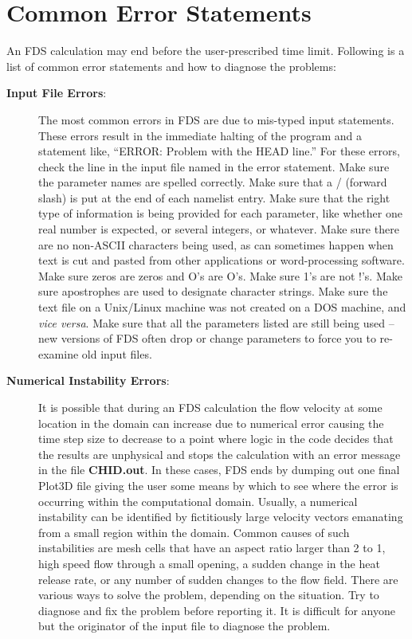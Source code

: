 \documentclass[11pt]{book}
\begin{document}
\section{Common Error Statements}
An FDS calculation may end before the user-prescribed time limit.
Following is a list of common error statements and how to diagnose the problems:
\begin{description}
\item[{\bf Input File Errors}:] 
The most common errors in FDS are due to mis-typed input statements.
These errors result in the immediate halting of the program and a statement like, ``ERROR: Problem
with the HEAD line.'' For these errors, check the line in the input file named in the error statement.
Make sure the parameter names are spelled correctly. Make sure that a / (forward slash)
is put at the end of each namelist entry. Make sure that the right type of information is
being provided for each parameter, like whether one real number is expected, or several integers, or
whatever. Make sure there are no non-ASCII characters being used, as can sometimes happen when text is
cut and pasted from other applications or word-processing software. Make sure zeros are zeros and
O's are O's. Make sure 1's are not !'s. Make sure apostrophes are used to designate character strings.
Make sure the text file on a Unix/Linux machine was not created on a DOS machine, and {\em vice versa}.
Make sure that all the parameters listed are still being used -- new versions of FDS often drop or
change parameters to force you to re-examine old input files.

\item [{\bf Numerical Instability Errors}:] 
It is possible that during an FDS calculation the flow
velocity at some location in the domain can increase due to numerical error causing the time step
size to decrease to a point where logic in the code decides that the results are unphysical
and stops the calculation with an error message in the file {\bf CHID.out}.
In these cases, FDS ends by dumping out one final
Plot3D file giving the user some means by which to see where the
error is occurring within the computational domain. Usually, a numerical
instability can be identified by fictitiously large velocity vectors emanating from
a small region within the domain. Common causes of such instabilities are
mesh cells that have an aspect ratio larger than 2 to 1, high speed flow through a small
opening, a sudden change in the heat release rate, or any number of sudden changes to the
flow field. There are various ways to solve the problem, depending on the situation.
Try to diagnose and fix the problem before reporting it. It is difficult
for anyone but the originator of the input file to diagnose the problem.


\end{description}
\end{document}
